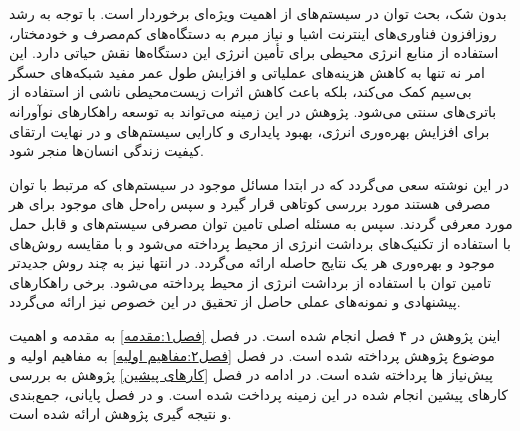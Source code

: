 بدون شک، بحث توان در سیستم‌های  از اهمیت ویژه‌ای برخوردار است. با توجه به رشد روزافزون فناوری‌های اینترنت اشیا و نیاز مبرم به دستگاه‌های کم‌مصرف و خودمختار، استفاده از منابع انرژی محیطی برای تأمین انرژی این دستگاه‌ها نقش حیاتی دارد. این امر نه تنها به کاهش هزینه‌های عملیاتی و افزایش طول عمر مفید شبکه‌های حسگر بی‌سیم کمک می‌کند، بلکه باعث کاهش اثرات زیست‌محیطی ناشی از استفاده از باتری‌های سنتی می‌شود. پژوهش در این زمینه می‌تواند به توسعه راهکارهای نوآورانه برای افزایش بهره‌وری انرژی، بهبود پایداری و کارایی سیستم‌های  و در نهایت ارتقای کیفیت زندگی انسان‌ها منجر شود.



در این نوشته سعی می‌گردد که در ابتدا مسائل موجود در سیستم‌های  که مرتبط با توان مصرفی هستند مورد بررسی کوتاهی قرار گیرد و سپس راه‌حل های موجود برای هر مورد معرفی گردند. سپس به مسئله اصلی تامین توان مصرفی سیستم‌های  و قابل حمل با استفاده از تکنیک‌های برداشت انرژی از محیط پرداخته می‌شود و با مقایسه روش‌های موجود و بهره‌وری هر یک نتایج حاصله ارائه می‌گردد. در انتها نیز به چند روش جدیدتر تامین توان با استفاده از برداشت انرژی از محیط پرداخته می‌شود. برخی راهکارهای پیشنهادی و نمونه‌های عملی حاصل از تحقیق در این خصوص نیز ارائه می‌گردد.


	
اینن پژوهش در ۴ فصل انجام شده است. در فصل \ref{فصل۱:مقدمه} به مقدمه و اهمیت موضوع پژوهش پرداخته شده است. در فصل \ref{فصل۲:مفاهیم اولیه} به مفاهیم اولیه و پیش‌نیاز ها پرداخته شده است. در ادامه در فصل \ref{کار‌های پیشین} پژوهش به بررسی کار‌های پیشین انجام شده در این زمینه پرداخت شده است. و در فصل پایانی، جمع‌بندی و نتیجه گیری پژوهش ارائه شده است.